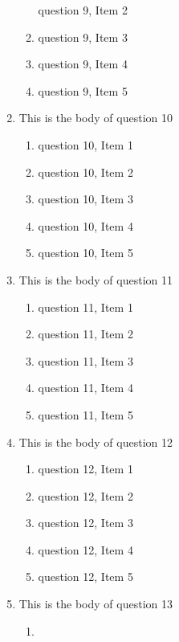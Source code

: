 \documentclass{article}
\begin{document}
\begin{enumerate}
\begin{enumerate}
    question 9, Item 2
    \item
    question 9, Item 3
    \item
    question 9, Item 4
    \item
    question 9, Item 5
    \end{enumerate}
\item
This is the body of question 10
    \begin{enumerate}
    \item
    question 10, Item 1
    \item
    question 10, Item 2
    \item
    question 10, Item 3
    \item
    question 10, Item 4
    \item
    question 10, Item 5
    \end{enumerate}
\item
This is the body of question 11
    \begin{enumerate}
    \item
    question 11, Item 1
    \item
    question 11, Item 2
    \item
    question 11, Item 3
    \item
    question 11, Item 4
    \item
    question 11, Item 5
    \end{enumerate}
\item
This is the body of question 12
    \begin{enumerate}
    \item
    question 12, Item 1
    \item
    question 12, Item 2
    \item
    question 12, Item 3
    \item
    question 12, Item 4
    \item
    question 12, Item 5
    \end{enumerate}
\item
This is the body of question 13
    \begin{enumerate}
    \item

\end{enumerate}
\end{enumerate}
\end{document}
